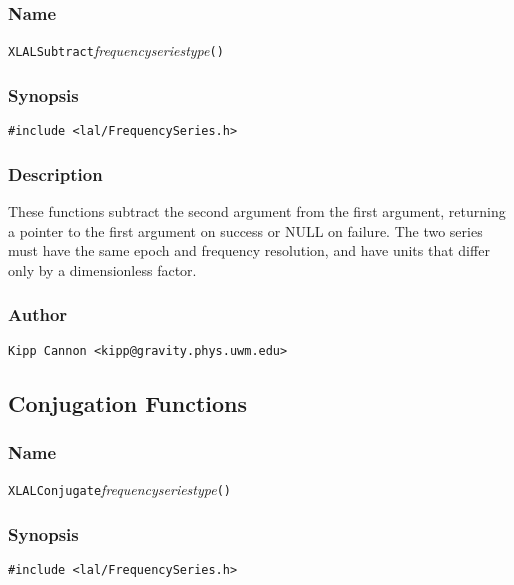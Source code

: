 \subsubsection{Name}

\texttt{XLALSubtract}\textit{frequencyseriestype}\texttt{()}

\subsubsection{Synopsis}

\begin{verbatim}
#include <lal/FrequencySeries.h>
\end{verbatim}


\subsubsection{Description}

These functions subtract the second argument from the first argument,
returning a pointer to the first argument on success or NULL on failure.
The two series must have the same epoch and frequency resolution, and have
units that differ only by a dimensionless factor.

\subsubsection{Author}

\verb|Kipp Cannon <kipp@gravity.phys.uwm.edu>|


\subsection{Conjugation Functions}

\subsubsection{Name}

\texttt{XLALConjugate}\textit{frequencyseriestype}\texttt{()}

\subsubsection{Synopsis}

\begin{verbatim}
#include <lal/FrequencySeries.h>
\end{verbatim}


